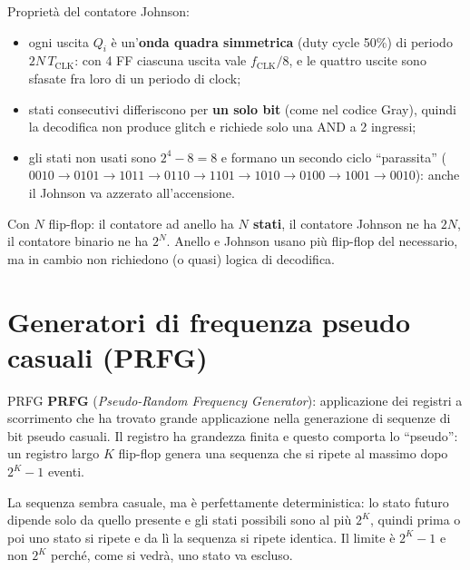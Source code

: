 \noindent Proprietà del contatore Johnson:
\begin{itemize}[leftmargin=1.5em, itemsep=2pt]
    \item ogni uscita $Q_i$ è un'\textbf{onda quadra simmetrica} (duty cycle 50\%) di periodo
          $2N\,T_{\text{CLK}}$: con 4 FF ciascuna uscita vale $f_{\text{CLK}}/8$, e le
          quattro uscite sono sfasate fra loro di un periodo di clock;
    \item stati consecutivi differiscono per \textbf{un solo bit} (come nel codice Gray),
          quindi la decodifica non produce glitch e richiede solo una AND a 2 ingressi;
    \item gli stati non usati sono $2^4-8=8$ e formano un secondo ciclo ``parassita''
          ($0010 \to 0101 \to 1011 \to 0110 \to 1101 \to 1010 \to 0100 \to 1001 \to 0010$):
          anche il Johnson va azzerato all'accensione.
\end{itemize}

\begin{important}
Con $N$ flip-flop: il contatore ad anello ha \textbf{$N$ stati}, il contatore Johnson ne ha
\textbf{$2N$}, il contatore binario ne ha $2^N$. Anello e Johnson usano più flip-flop del
necessario, ma in cambio non richiedono (o quasi) logica di decodifica.
\end{important}

\section{Generatori di frequenza pseudo casuali (PRFG)}

\begin{definizione}{PRFG}
\textbf{PRFG} (\emph{Pseudo-Random Frequency Generator}): applicazione dei registri a
scorrimento che ha trovato grande applicazione nella generazione di sequenze di bit
pseudo casuali. Il registro ha grandezza finita e questo comporta lo ``pseudo'': un
registro largo $K$ flip-flop genera una sequenza che si ripete al massimo dopo $2^K-1$
eventi.
\end{definizione}

\noindent La sequenza sembra casuale, ma è perfettamente deterministica: lo stato futuro
dipende solo da quello presente e gli stati possibili sono al più $2^K$, quindi prima o poi
uno stato si ripete e da lì la sequenza si ripete identica. Il limite è $2^K-1$ e non $2^K$
perché, come si vedrà, uno stato va escluso.

